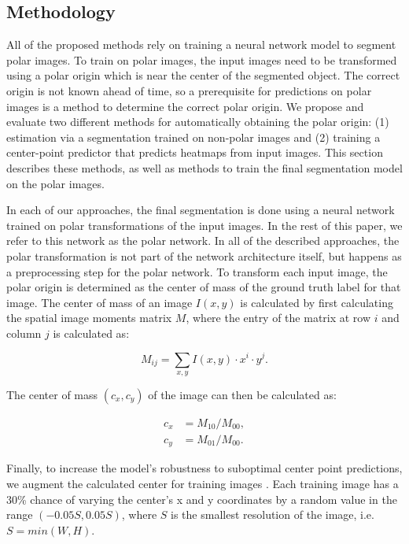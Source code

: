   \subsection{Methodology}
  
All of the proposed methods rely on training a neural network model to segment polar images. To train on 
polar images, the input images need to be transformed using a polar origin which is near the center of 
the 
segmented object. The correct origin is not known ahead of time, so a prerequisite for predictions on polar
images is a method to determine the correct polar origin. We propose and 
evaluate two different methods for automatically obtaining the polar origin: (1)
estimation via a segmentation trained on non-polar images and (2) training a center-point predictor that predicts heatmaps from input images. 
This section describes these methods, as well as methods to train the 
final segmentation model on the polar images.
      
In each of our approaches, the final segmentation is done using a neural network trained on polar 
transformations of the input images. In the rest of this paper, we refer to this network as the polar 
network. In all of the described approaches, the polar transformation is not part of the network architecture itself, but happens as a preprocessing step for the polar network.
To transform each input image, the polar origin is determined as the center of mass of the 
ground truth label for that image. The center of mass of an image $I(x, y)$ is calculated by first 
calculating the spatial image moments matrix $M$, where the entry of the matrix at row $i$ and column $j$ is calculated as:

  \begin{equation}
    M_{ij}= \sum _{x,y} I(x,y) \cdot x^i \cdot y^j.
    \label{eq:moments}
  \end{equation}
  
The center of mass $(c_x, c_y)$ of the image can then be calculated as:

  \begin{equation}
    \begin{aligned}
      c_x &= M_{10} / M_{00}, \\
      c_y &= M_{01} / M_{00}.
    \end{aligned}
    \label{eq:center-mass}
  \end{equation}

Finally, to increase the model's robustness to suboptimal center point predictions, we augment the 
calculated center for training images \cite{estevesPolarTransformerNetworks2018a}. Each training image has 
a 30\% chance of varying the center's x and y coordinates by a random value in the range $(-0.05S, 
0.05S)$, where $S$ is the smallest resolution of the image, i.e. $S = min(W, H)$.
 

